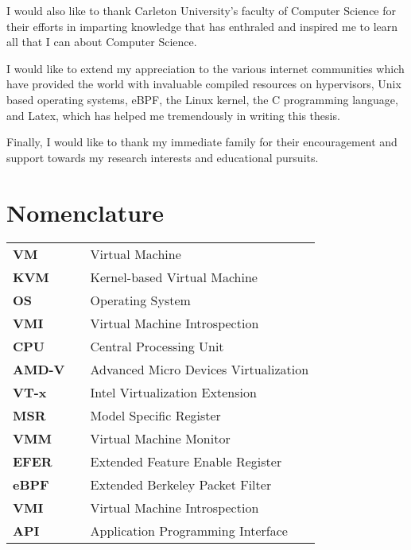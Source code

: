 \documentclass{report}
\begin{document}
\begin{spacing}{1.5}
{\large I would also like to thank Carleton University's faculty of Computer Science for their efforts in imparting knowledge that has enthraled and inspired me to learn all that I can about Computer Science.}

{\large I would like to extend my appreciation to the various internet communities which have provided the world with invaluable compiled resources on hypervisors, Unix based operating systems, eBPF, the Linux kernel, the C programming language, and Latex, which has helped me tremendously in writing this thesis.}

{\large Finally, I would like to thank my immediate family for their encouragement and support towards my research interests and educational pursuits.}

\tableofcontents












\newpage
\chapter*{Nomenclature}

\begin{tabular}{lcl}
\large{\bf VM}  & & \large{Virtual Machine} \\
\large{\bf KVM}  & & \large{Kernel-based Virtual Machine} \\
\large{\bf OS}   & & \large{Operating System}        \\
\large{\bf VMI}  & & \large{Virtual Machine Introspection} \\
\large{\bf CPU}  & & \large{Central Processing Unit} \\
\large{\bf AMD-V}  & & \large{Advanced Micro Devices Virtualization} \\
\large{\bf VT-x}  & & \large{Intel Virtualization Extension} \\
\large{\bf MSR}  & & \large{Model Specific Register} \\
\large{\bf VMM}  & & \large{Virtual Machine Monitor} \\
\large{\bf EFER}  & & \large{Extended Feature Enable Register} \\
\large{\bf eBPF}  & & \large{Extended Berkeley Packet Filter} \\
\large{\bf VMI}  & & \large{Virtual Machine Introspection} \\
\large{\bf API}  & & \large{Application Programming Interface} \\
\end{tabular}















\end{spacing}
\end{document}
